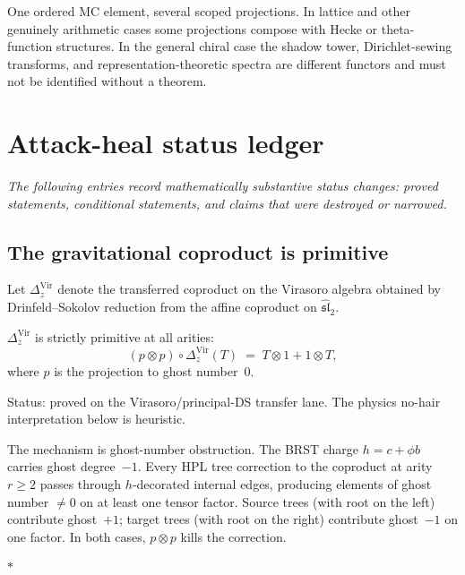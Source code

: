 \documentclass[11pt]{article}
\newcommand{\fsl}{\mathfrak{sl}}
\newcommand{\sep}{\bigskip\begin{center}$*$\end{center}\medskip}
\begin{document}
\medskip

One ordered MC element, several scoped projections.  In lattice
and other genuinely arithmetic cases some projections compose
with Hecke or theta-function structures.  In the general chiral
case the shadow tower, Dirichlet-sewing transforms, and
representation-theoretic spectra are different functors and must
not be identified without a theorem.


\section{Attack-heal status ledger}
\label{sec:swarm-findings}

\noindent\textit{The following entries record mathematically
substantive status changes: proved statements, conditional
statements, and claims that were destroyed or narrowed.}


\subsection{The gravitational coproduct is primitive}
\label{sec:grav-coproduct-primitive}

Let $\Delta_z^{\mathrm{Vir}}$ denote the transferred coproduct
on the Virasoro algebra obtained by Drinfeld--Sokolov reduction
from the affine coproduct on $\widehat{\fsl}_2$.
\begin{theorem}\label{thm:grav-coproduct-primitive}
$\Delta_z^{\mathrm{Vir}}$ is strictly primitive at all arities:
\[
(p \otimes p) \circ \Delta_z^{\mathrm{Vir}}(T)
\;=\; T \otimes 1 + 1 \otimes T,
\]
where $p$ is the projection to ghost number~$0$.
\end{theorem}

\noindent
Status: proved on the Virasoro/principal-DS transfer lane.  The
physics no-hair interpretation below is heuristic.

The mechanism is ghost-number obstruction.  The BRST charge
$h = c + \phi b$ carries ghost degree~$-1$.  Every HPL tree
correction to the coproduct at arity~$r \geq 2$ passes through
$h$-decorated internal edges, producing elements of ghost number
$\neq 0$ on at least one tensor factor.  Source trees (with root
on the left) contribute ghost~$+1$; target trees (with root on
the right) contribute ghost~$-1$ on one factor.  In both cases,
$p \otimes p$ kills the correction.

\sep
\end{document}

